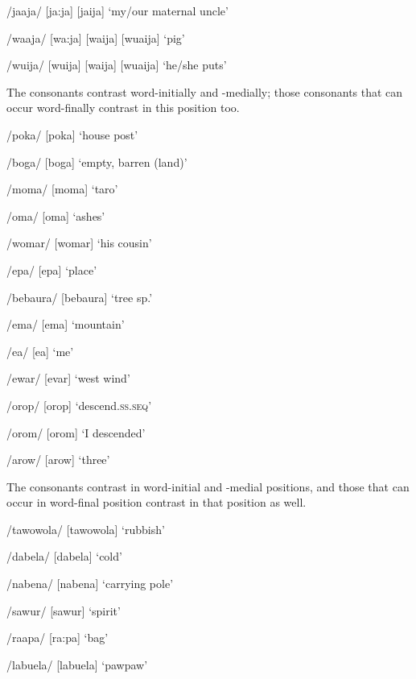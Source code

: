 /jaaja/  [{{\textprimstress}ja:ja}] {\Tilde} [{{\textprimstress}jaija}]  `my/our maternal uncle'

/waaja/  [{{\textprimstress}wa:ja}] {\Tilde} [{{\textprimstress}waija}] {\Tilde} [{{\textprimstress}wuaija}]  `pig'

/wuija/  [{{\textprimstress}wuija}] {\Tilde} [{{\textprimstress}waija}] {\Tilde} [{{\textprimstress}wuaija}]  `he/she puts'

The  consonants contrast word-initially and -medially; those consonants that can occur word-finally contrast in this position too. 

/poka/  [po{{\textprimstress}ka}]  `house post'

/boga/  [bo{{\textprimstress}ga}]  `empty, barren (land)'

/moma/  [mo{{\textprimstress}ma}]  `taro'

/{\textphi}oma/  [{\textphi}o{{\textprimstress}ma}]  `ashes'

/womar/  [wo{{\textprimstress}mar}]  `his cousin'

/epa/  [e{{\textprimstress}pa}]  `place'

/bebaura/  [be{{\textprimstress}baura}]  `tree sp.'

/ema/  [e{{\textprimstress}ma}]  `mountain'

/e{\textphi}a/  [e{{\textprimstress}}{\textphi}a]  `me'

/ewar/  [e{{\textprimstress}var}]  `west wind'

/orop/  [o{{\textprimstress}rop}]  `descend.\textsc{ss.seq}'

/orom/  [o{{\textprimstress}rom}]  `I descended'

/arow/  [a{{\textprimstress}row}]  `three'

The  consonants contrast in word-initial and -medial positions, and those that can occur in word-final position contrast in that position as well.

/tawowola/  [ta{{\textprimstress}wowola}]  `rubbish'

/dabela/  [da{{\textprimstress}bela}]  `cold'

/nabena/  [na{{\textprimstress}bena}]  `carrying pole'

/sawur/  [sa{{\textprimstress}wur}]  `spirit'    

/raapa/  [{{\textprimstress}ra:pa}]  `bag'

/labuela/  [la{{\textprimstress}buela}]  `pawpaw'

